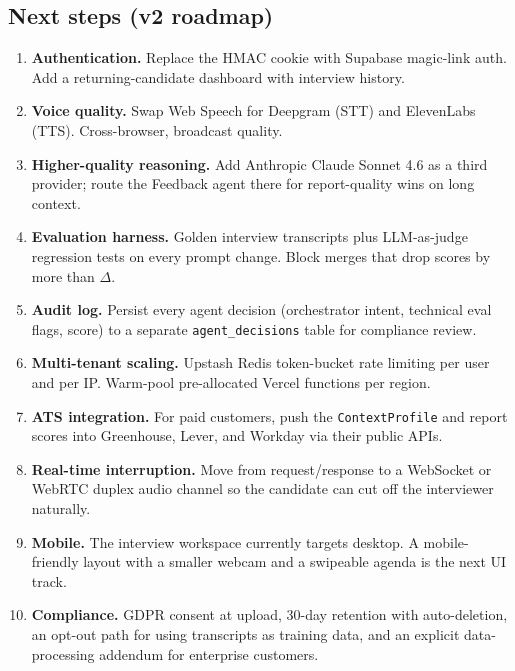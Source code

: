 \documentclass[11pt,a4paper]{article}
\begin{document}
\subsection{Next steps (v2 roadmap)}

\begin{enumerate}
  \item \textbf{Authentication.} Replace the HMAC cookie with Supabase
        magic-link auth. Add a returning-candidate dashboard with
        interview history.
  \item \textbf{Voice quality.} Swap Web Speech for Deepgram (STT) and
        ElevenLabs (TTS). Cross-browser, broadcast quality.
  \item \textbf{Higher-quality reasoning.} Add Anthropic Claude Sonnet
        4.6 as a third provider; route the Feedback agent there for
        report-quality wins on long context.
  \item \textbf{Evaluation harness.} Golden interview transcripts plus
        LLM-as-judge regression tests on every prompt change. Block
        merges that drop scores by more than $\Delta$.
  \item \textbf{Audit log.} Persist every agent decision (orchestrator
        intent, technical eval flags, score) to a separate
        \texttt{agent\_decisions} table for compliance review.
  \item \textbf{Multi-tenant scaling.} Upstash Redis token-bucket rate
        limiting per user and per IP. Warm-pool pre-allocated Vercel
        functions per region.
  \item \textbf{ATS integration.} For paid customers, push the
        \texttt{ContextProfile} and report scores into Greenhouse,
        Lever, and Workday via their public APIs.
  \item \textbf{Real-time interruption.} Move from request/response to a
        WebSocket or WebRTC duplex audio channel so the candidate can
        cut off the interviewer naturally.
  \item \textbf{Mobile.} The interview workspace currently targets
        desktop. A mobile-friendly layout with a smaller webcam and
        a swipeable agenda is the next UI track.
  \item \textbf{Compliance.} GDPR consent at upload, 30-day retention
        with auto-deletion, an opt-out path for using transcripts as
        training data, and an explicit data-processing addendum for
        enterprise customers.
\end{enumerate}
\end{document}
